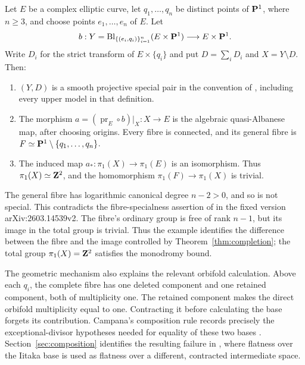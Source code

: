 \begin{theorem}\label{thm:example}
Let $E$ be a complex elliptic curve, let $q_1,\ldots,q_n$ be distinct points
of $\mathbf P^1$, where $n\geq3$, and choose points $e_1,\ldots,e_n$ of $E$.
Let
\[
 b:Y=\operatorname{Bl}_{\{(e_i,q_i)\}_{i=1}^n}(E\times\mathbf P^1)
     \longrightarrow E\times\mathbf P^1.
\]
Write $D_i$ for the strict transform of $E\times\{q_i\}$ and put
$D=\sum_iD_i$ and $X=Y\setminus D$. Then:
\begin{enumerate}[label=\textup{(\roman*)},leftmargin=2em]
\item $(Y,D)$ is a smooth projective special pair in the convention of
      \cite[Definitions 2.1--2.9]{CDHP2026}, including every upper model
      in that definition.
\item The morphism $a=(\operatorname{pr}_E\circ b)|_X:X\to E$ is the
      algebraic quasi-Albanese map, after choosing origins. Every
      fibre is connected, and its general fibre is
      $F\simeq\mathbf P^1\setminus\{q_1,\ldots,q_n\}$.
\item The induced map $a_*:\pi_1(X)\to\pi_1(E)$ is an isomorphism.
      Thus $\pi_1(X)\simeq\mathbf Z^2$, and the homomorphism
      $\pi_1(F)\to\pi_1(X)$ is trivial.
\end{enumerate}
\end{theorem}

The general fibre has logarithmic canonical degree $n-2>0$, and so is
not special. This contradicts the fibre-specialness assertion of
\cite[Theorem E, equivalently Theorem 7.15]{CDHP2026} in the fixed
version arXiv:2603.14539v2. The fibre's ordinary group is free of rank $n-1$,
but its image in the total group is trivial. Thus the example
identifies the difference between the fibre and the image controlled
by Theorem~\ref{thm:completion}; the total group $\pi_1(X)=\mathbf Z^2$
satisfies the monodromy bound.

The geometric mechanism also explains the relevant orbifold
calculation. Above each $q_i$, the complete fibre has one deleted
component and one retained component, both of multiplicity one. The
retained component makes the direct orbifold multiplicity equal to
one. Contracting it before calculating the base forgets its
contribution. Campana's composition rule records precisely the
exceptional-divisor hypotheses needed for equality of these two bases
\cite[arXiv version, Proposition 3.13]{Campana2011}.
Section~\ref{sec:composition} identifies the resulting failure in
\cite[Claim 7.17]{CDHP2026}, where flatness over the Iitaka base is
used as flatness over a different, contracted intermediate space.

